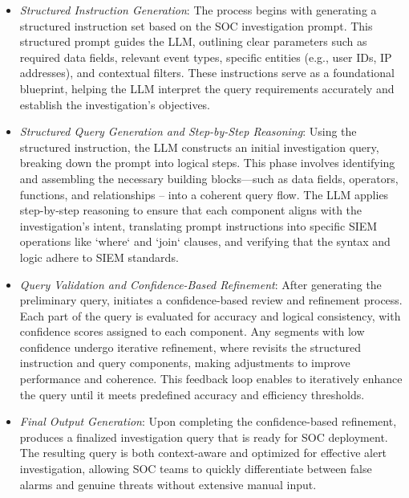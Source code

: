 \begin{itemize}[leftmargin=*,noitemsep,topsep=-1pt]
    
    \item \textit{Structured Instruction Generation}: The process begins with \Sysb generating a structured instruction set based on the SOC investigation prompt. This structured prompt guides the LLM, outlining clear parameters such as required data fields, relevant event types, specific entities (e.g., user IDs, IP addresses), and contextual filters. These instructions serve as a foundational blueprint, helping the LLM interpret the query requirements accurately and establish the investigation’s objectives.
    
    \item \textit{Structured Query Generation and Step-by-Step Reasoning}: Using the structured instruction, the LLM constructs an initial investigation query, breaking down the prompt into logical steps. This phase involves identifying and assembling the necessary building blocks—such as data fields, operators, functions, and relationships -- into a coherent query flow. The LLM applies step-by-step reasoning to ensure that each component aligns with the investigation's intent, translating prompt instructions into specific SIEM operations like `where` and `join` clauses, and verifying that the syntax and logic adhere to SIEM standards.

    \item \textit{Query Validation and Confidence-Based Refinement}: After generating the preliminary query, \Sysb initiates a confidence-based review and refinement process. Each part of the query is evaluated for accuracy and logical consistency, with confidence scores assigned to each component. Any segments with low confidence undergo iterative refinement, where \Sysb revisits the structured instruction and query components, making adjustments to improve performance and coherence. This feedback loop enables \Sysb to iteratively enhance the query until it meets predefined accuracy and efficiency thresholds.
    
    \item \textit{Final Output Generation}: Upon completing the confidence-based refinement, \Sysb produces a finalized investigation query that is ready for SOC deployment. The resulting query is both context-aware and optimized for effective alert investigation, allowing SOC teams to quickly differentiate between false alarms and genuine threats without extensive manual input.
    

\end{itemize}


